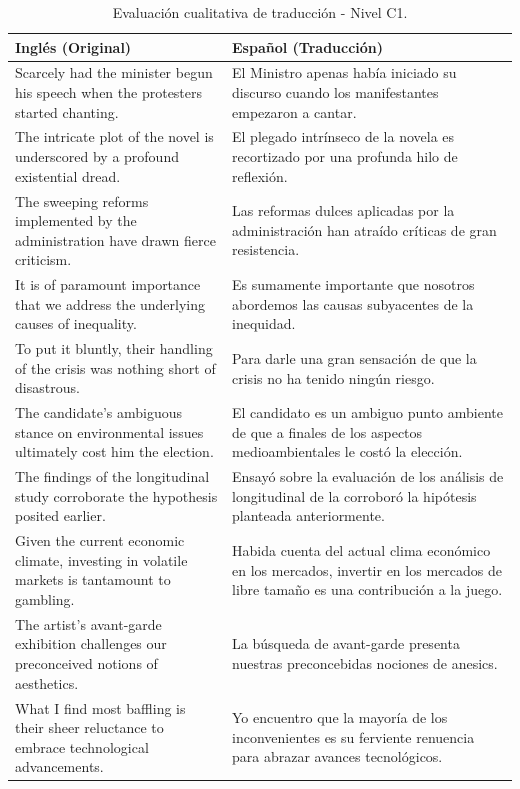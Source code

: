 \begin{table}[t]
    \centering
    \begin{tabular}{p{} p{}}
        \toprule
        \textbf{Inglés (Original)} & \textbf{Español (Traducción)} \\
        \midrule
        Scarcely had the minister begun his speech when the protesters started chanting. & El Ministro apenas había iniciado su discurso cuando los manifestantes empezaron a cantar. \\
        The intricate plot of the novel is underscored by a profound existential dread. & El plegado intrínseco de la novela es recortizado por una profunda hilo de reflexión. \\
        The sweeping reforms implemented by the administration have drawn fierce criticism. & Las reformas dulces aplicadas por la administración han atraído críticas de gran resistencia. \\
        It is of paramount importance that we address the underlying causes of inequality. & Es sumamente importante que nosotros abordemos las causas subyacentes de la inequidad. \\
        To put it bluntly, their handling of the crisis was nothing short of disastrous. & Para darle una gran sensación de que la crisis no ha tenido ningún riesgo. \\
        The candidate's ambiguous stance on environmental issues ultimately cost him the election. & El candidato es un ambiguo punto ambiente de que a finales de los aspectos medioambientales le costó la elección. \\
        The findings of the longitudinal study corroborate the hypothesis posited earlier. & Ensayó sobre la evaluación de los análisis de longitudinal de la corroboró la hipótesis planteada anteriormente. \\
        Given the current economic climate, investing in volatile markets is tantamount to gambling. & Habida cuenta del actual clima económico en los mercados, invertir en los mercados de libre tamaño es una contribución a la juego. \\
        The artist's avant-garde exhibition challenges our preconceived notions of aesthetics. & La búsqueda de avant-garde presenta nuestras preconcebidas nociones de anesics. \\
        What I find most baffling is their sheer reluctance to embrace technological advancements. & Yo encuentro que la mayoría de los inconvenientes es su ferviente renuencia para abrazar avances tecnológicos. \\
        \bottomrule
    \end{tabular}
    \caption{Evaluación cualitativa de traducción - Nivel C1.}
    \label{tab:evaluacion_C1}
\end{table}

